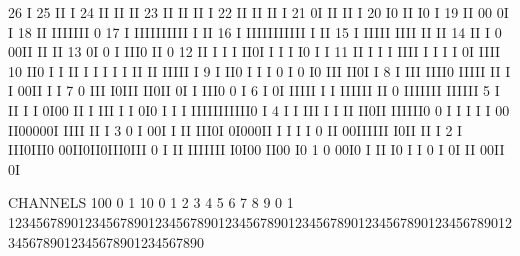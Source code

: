 \begin{Listing}
       26                                I
       25                                II     I
       24                                II II II
       23                                II II II                                    I
       22                                II II II                                    I
       21                                0I II II                                    I
       20                                I0 II I0                                    I
       19                                II 00 0I                                    I
       18                                II IIIIIII                                  0
       17                            I   IIIIIIIIII I                                II
       16                            I    IIIIIIIIIII                              I II
       15                            I     IIIII IIII                             II II
       14                            II    I  0  00II                             II II
       13                            0I    0  I  III0                             II  0
       12                            II I  I  I  II0I                    I   I  I I0  I  I
       11                            II I  I  I  IIII    I               I   I  I 0I  IIII
       10                           II0 I  I       II I  I               I I I II II  IIIII  I
        9                           I II0          I  I  I               0 I 0 I0 III  II0I  I
        8                           I III            IIII0               IIIII II I I  00II  I       I
        7                           0 III            I0III               II0II 0I   I  III0  0       I
        6                           I  0I            IIIII  I         I IIIIII II   0  IIIIIII  IIIIII
        5                   I    II I  I             0I00   II  I III I I 0I0  I I  I     IIIIIIIIIII0  I
        4                   I  I III   I             I II II0II IIIIII0 0 I I I  I  I      00 II00000I IIII   II  I
        3                   0  I 00I                 I II III0I 0I000II I I I I  0         II 00IIIIII I0II   II  I
        2                 I III0III0                      00II0II0III0III     0  I         II IIIIIII I0I00 II00 I0
        1                 0  00I0  I                      II  I0 I   I 0      I                       0I II 00II 0I
 
 CHANNELS 100   0                                                                                                  1   
           10   0        1         2         3         4         5         6         7         8         9         0   
            1   1234567890123456789012345678901234567890123456789012345678901234567890123456789012345678901234567890   
 

\end{Listing}
